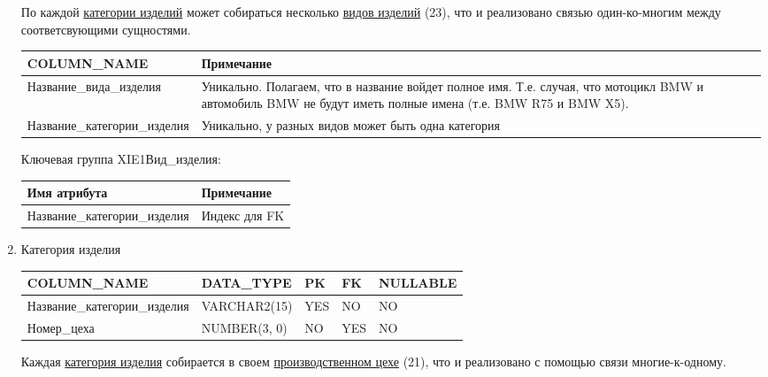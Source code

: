 \begin{enumerate}
\begin{tabular}{|p{4cm}|p{3cm}|p{1cm}|p{1cm}|p{2cm}|}
    \end{tabular}

    По каждой \underline{категории изделий} может собираться несколько \underline{видов изделий} (23), что и реализовано связью один-ко-многим между соответсвующими сущностями.

    \begin{tabular}{|p{4cm}|p{5cm}|} \hline

        {\bf COLUMN\_NAME} & {\bf Примечание} \\ \hline
        Название\_вида\_изделия & Уникально. Полагаем, что в название войдет полное имя. Т.е. случая, что мотоцикл BMW и автомобиль BMW не будут иметь полные имена (т.е. BMW R75 и BMW X5).  \\ \hline
        Название\_категории\_изделия & Уникально, у разных видов может быть одна категория \\ \hline

    \end{tabular}

    Ключевая группа XIE1Вид\_изделия:

    \begin{tabular}{|p{4cm}|p{5cm}|} \hline

        {\bf Имя атрибута} & {\bf Примечание} \\ \hline
        Название\_категории\_изделия & Индекс для FK \\ \hline

    \end{tabular}

    \item{Категория изделия}

    \begin{tabular}{|p{4cm}|p{3cm}|p{1cm}|p{1cm}|p{2cm}|} \hline

        {\bf COLUMN\_NAME} & {\bf DATA\_TYPE} & {\bf PK} & {\bf FK} & {\bf NULLABLE} \\ \hline
        Название\_категории\_изделия & VARCHAR2(15) & YES & NO & NO \\ \hline
        Номер\_цеха & NUMBER(3, 0) & NO & YES & NO \\ \hline

    \end{tabular}

    Каждая \underline{категория изделия} собирается в своем \underline{производственном цехе} (21), что и реализовано с помощью связи многие-к-одному.

    \begin{tabular}{|p{4cm}|p{5cm}|} \hline


\end{tabular}
\end{enumerate}
